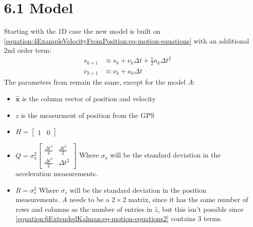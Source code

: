 \documentclass[letterpaper,10pt,english]{jupyterBook}
\begin{document}
\section{6.1 Model}
\label{\detokenize{6ExtendedKalman:model}}
\sphinxAtStartPar
Starting with the 1D case the new model is built on \eqref{equation:4ExampleVelocityFromPosition:eq-motion-equations} with an additional 2nd order term:
\begin{equation}\label{equation:6ExtendedKalman:eq-motion-equations2}
\begin{split}s_{k+1} &\approx s_k + \nu_k\Delta t + \frac{1}{2}a_k \Delta t^2\\
\nu_{k+1} &\approx \nu_k + a_k\Delta t\end{split}
\end{equation}
\sphinxAtStartPar
The parameters from {\hyperref[\detokenize{6ExtendedKalman:4bExampleVelocityFromPosition.md:model}]{}} remain the same, except for the model \(A\):
\begin{itemize}
\item {} 
\sphinxAtStartPar
\(\hat{\boldsymbol{x}}\) is the column vector of position and velocity

\item {} 
\sphinxAtStartPar
\(z\) is the measurment of position from the GPS

\item {} 
\sphinxAtStartPar
\(H = \begin{bmatrix} 1 & 0 \end{bmatrix}\)

\item {} 
\sphinxAtStartPar
\(Q = \sigma_a^2 \begin{bmatrix} \frac{\Delta t^4}{4} & \frac{\Delta t^3}{2} \\ \frac{\Delta t^3}{2} & \Delta t^2 \end{bmatrix}\) Where \(\sigma_a\) will be the standard deviation in the acceleration measurements.

\item {} 
\sphinxAtStartPar
\(R = \sigma_s^2\) Where \(\sigma_s\) will be the standard deviation in the position measurements.
\(A\) needs to be a \(2 \times 2\) matrix, since it has the same number of rows and columns as the number of entries in \(\hat{z}\), but this isn’t possible since \eqref{equation:6ExtendedKalman:eq-motion-equations2} contains 3 terms.

\end{itemize}
\end{document}
